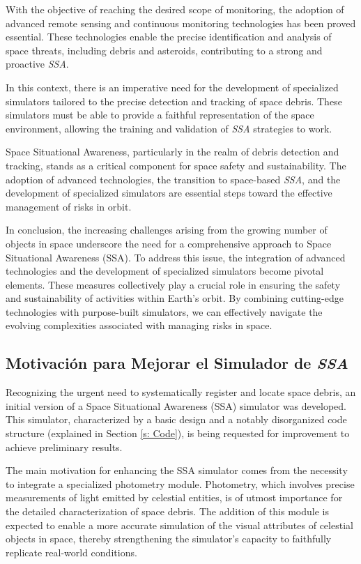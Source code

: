 With the objective of  reaching the desired scope of monitoring, the adoption of advanced remote sensing and continuous monitoring technologies  has been proved essential. These technologies enable the precise identification and analysis of space threats, including debris and asteroids, contributing to a strong and proactive \textit{SSA}.


In this context, there is an imperative need for the development of specialized simulators tailored to the precise detection and tracking of space debris. These simulators must be able to provide a faithful representation of the space environment, allowing  the training and validation of \textit{SSA} strategies to work.


Space Situational Awareness, particularly in the realm of debris detection and tracking, stands as a critical component for space safety and sustainability. The adoption of advanced technologies, the transition to space-based \textit{SSA}, and the development of specialized simulators are essential steps toward the effective management of risks in orbit.

In conclusion, the increasing challenges arising from the growing number of objects in space underscore the need for a comprehensive approach to Space Situational Awareness (SSA). To address this issue, the integration of advanced technologies and the development of specialized simulators become pivotal elements. These measures collectively play a crucial role in ensuring the safety and sustainability of activities within Earth's orbit. By combining cutting-edge technologies with purpose-built simulators, we can effectively navigate the evolving complexities associated with managing risks in space.


\subsection{Motivación para Mejorar el Simulador de \textit{SSA}}

Recognizing the urgent need to systematically register and locate space debris, an initial version of a Space Situational Awareness (SSA) simulator was developed. This simulator, characterized by a basic design and a notably disorganized code structure (explained in Section \ref{s: Code}), is being requested for improvement to achieve preliminary results.

The main motivation for enhancing the SSA simulator comes from the necessity to integrate a specialized photometry module. Photometry, which involves precise measurements of light emitted by celestial entities, is of utmost importance for the detailed characterization of space debris. The addition of this module is expected to enable a more accurate simulation of the visual attributes of celestial objects in space, thereby strengthening the simulator's capacity to faithfully replicate real-world conditions.

